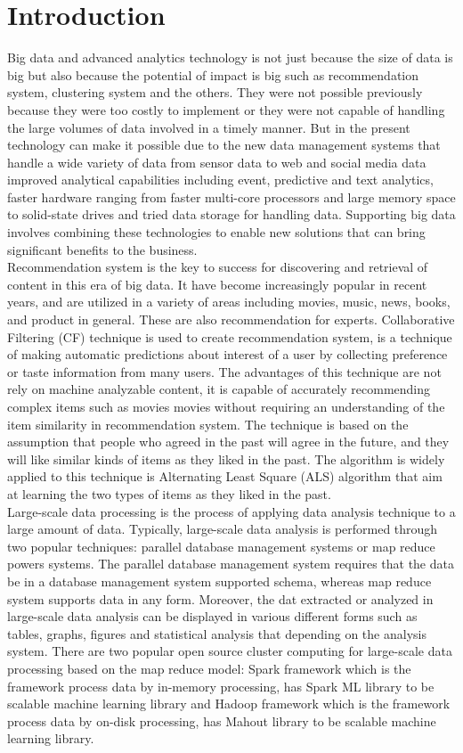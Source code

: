 \documentclass[conference]{IEEEtran}
\begin{document}
\section{Introduction}
Big data and advanced analytics technology is not just because the size of data is big but also because the potential of impact is big such as recommendation system, clustering system and the others. They were not possible previously because they were too costly to implement or they were not capable of handling the large volumes of data involved in a timely manner. But in the present technology can make it possible due to the new data management systems that handle a wide variety of data from sensor data to web and social media data improved analytical capabilities including event, predictive and text analytics, faster hardware ranging from faster multi-core processors and large memory space to solid-state drives and tried data storage for handling data. Supporting big data involves combining these technologies to enable new solutions that can bring significant benefits to the business.\\
\indent Recommendation system is the key to success for discovering and retrieval of content in this era of big data. It have become increasingly popular in recent years, and are utilized in a variety of areas including movies, music, news, books, and product in general. These are also recommendation for experts. Collaborative Filtering (CF) technique is used to create recommendation system, is a technique of making automatic predictions about interest of a user by collecting preference or taste information from many users. The advantages of this technique are not rely on machine analyzable content, it is capable of accurately recommending complex items such as movies movies without requiring an understanding of the item similarity in recommendation system. The technique is based on the assumption that people who agreed in the past will agree in the future, and they will like similar kinds of items as they liked in the past. The algorithm is widely applied to this technique is Alternating Least Square (ALS) algorithm that aim at learning the two types of items as they liked in the past.\\
\indent Large-scale data processing is the process of applying data analysis technique to a large amount of data. Typically, large-scale data analysis is performed through two popular techniques: parallel database management systems or map reduce powers systems. The parallel database management system requires that the data be in a database management system supported schema, whereas map reduce system supports data in any form. Moreover, the dat extracted or analyzed in large-scale data analysis can be displayed in various different forms such as tables, graphs, figures and statistical analysis that depending on the analysis system. There are two popular open source cluster computing for large-scale data processing based on the map reduce model: Spark framework which is the framework process data by in-memory processing, has Spark ML library to be scalable machine learning library and Hadoop framework which is the framework process data by on-disk processing, has Mahout library to be scalable machine learning library.
\end{document}
